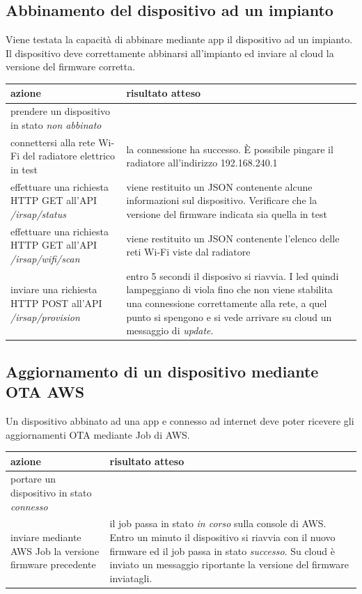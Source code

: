 \documentclass[12pt,a4paper,twoside,titlepage]{book}
\begin{document}
\subsection{Abbinamento del dispositivo ad un impianto}

Viene testata la capacità di abbinare mediante app il dispositivo ad un impianto.
Il dispositivo deve correttamente abbinarsi all’impianto ed inviare al cloud la versione
del firmware corretta.

\begin{center}
\begin{tabular}{| p{5cm} | p{5cm} |}
    \hline \textbf{azione} & \textbf{risultato atteso} \\
    \hline prendere un dispositivo in stato \textit{non abbinato} & \\
    \hline connettersi alla rete Wi-Fi del radiatore elettrico in test & la connessione ha successo. È possibile pingare il radiatore all'indirizzo 192.168.240.1 \\
    \hline effettuare una richiesta HTTP GET all'API \textit{/irsap/status} & viene restituito un JSON contenente alcune informazioni sul dispositivo. Verificare che la versione del firmware indicata sia quella in test \\
    \hline effettuare una richiesta HTTP GET all'API \textit{/irsap/wifi/scan} & viene restituito un JSON contenente l'elenco delle reti Wi-Fi viste dal radiatore \\
    \hline inviare una richiesta HTTP POST all'API \textit{/irsap/provision} & entro 5 secondi il disposivo si riavvia. I led quindi lampeggiano di viola fino che non viene stabilita una connessione correttamente alla rete, a quel punto si spengono e si vede arrivare su cloud un messaggio di \textit{update}. \\
    \hline
\end{tabular}
\end{center}

\subsection{Aggiornamento di un dispositivo mediante OTA AWS}

Un dispositivo abbinato ad una app e connesso ad internet deve poter ricevere gli
aggiornamenti OTA mediante Job di AWS.

\begin{center}
\begin{tabular}{| p{5cm} | p{5cm} |}
    \hline \textbf{azione} & \textbf{risultato atteso} \\
    \hline portare un dispositivo in stato \textit{connesso} & \\
    \hline inviare mediante AWS Job la versione firmware precedente & il job passa in stato \textit{in corso} sulla console di AWS. Entro un minuto il dispositivo si riavvia con il nuovo firmware ed il job passa in stato \textit{successo}. Su cloud è inviato un messaggio riportante la versione del firmware inviatagli. \\
    \hline
\end{tabular}
\end{center}
\end{document}
